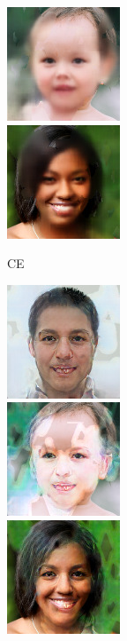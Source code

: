 \begin{figure}[t]
\begin{subfigure}[t]{0.25\textwidth}
      \includegraphics[height=\ffhqimgheight]{figs/cigcvae/image-samples/ffhq256/freeform_ce_13_samples.jpg}\\
      \includegraphics[height=\ffhqimgheight]{figs/cigcvae/image-samples/ffhq256/freeform_ce_32_samples.jpg}
      \caption{CE}
    \end{subfigure}
    \begin{subfigure}[t]{0.25\textwidth}
      \centering
      \includegraphics[height=\ffhqimgheight]{figs/cigcvae/image-samples/ffhq256/freeform_rfr_0_samples.jpg}\\
      \includegraphics[height=\ffhqimgheight]{figs/cigcvae/image-samples/ffhq256/freeform_rfr_13_samples.jpg}\\
      \includegraphics[height=\ffhqimgheight]{figs/cigcvae/image-samples/ffhq256/freeform_rfr_32_samples.jpg}

\end{subfigure}
\end{figure}
